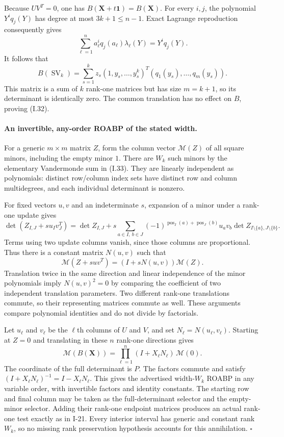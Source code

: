 Because $UV^T=0$, one has $B(\mathbf X+t\mathbf1)=B(\mathbf X)$.
For every $i,j$, the polynomial $Y^i q_j(Y)$ has degree at most
$3k+1\le n-1$.  Exact Lagrange reproduction consequently gives
\[
 \sum_{\ell=1}^n a_\ell^i q_j(a_\ell)\lambda_\ell(Y)
    =Y^i q_j(Y).
\]
It follows that
\[
 B(\operatorname{SV}_k)
   =\sum_{s=1}^k z_s
       (1,y_s,\ldots,y_s^k)^T
       (q_1(y_s),\ldots,q_m(y_s)).
\]
This matrix is a sum of $k$ rank-one matrices but has size
$m=k+1$, so its determinant is identically zero.  The common
translation has no effect on $B$, proving (I.32).

\paragraph{An invertible, any-order ROABP of the stated width.}
For a generic $m\times m$ matrix $Z$, form the column vector
$\mathcal M(Z)$ of all square minors, including the empty
minor $1$.  There are $W_k$ such minors by the elementary
Vandermonde sum in (I.33).  They are linearly independent as
polynomials: distinct row/column index sets have distinct
row and column multidegrees, and each individual determinant
is nonzero.

For fixed vectors $u,v$ and an indeterminate $s$, expansion
of a minor under a rank-one update gives
\[
 \det(Z_{I,J}+s u_Iv_J^T)
 =\det Z_{I,J}
  +s\sum_{a\in I,\ b\in J}
        (-1)^{\operatorname{pos}_I(a)+\operatorname{pos}_J(b)}
        u_av_b\det Z_{I\setminus\{a\},J\setminus\{b\}}.
\]
Terms using two update columns vanish, since those columns are
proportional.  Thus there is a constant matrix $N(u,v)$ such that
\[
 \mathcal M(Z+suv^T)=(I+sN(u,v))\mathcal M(Z).
\]
Translation twice in the same direction and linear independence
of the minor polynomials imply $N(u,v)^2=0$ by comparing the
coefficient of two independent translation parameters.  Two
different rank-one translations commute, so their representing
matrices commute as well.  These arguments compare polynomial
identities and do not divide by factorials.

Let $u_\ell$ and $v_\ell$ be the $\ell$th columns of $U$ and
$V$, and set $N_\ell=N(u_\ell,v_\ell)$.  Starting at $Z=0$
and translating in these $n$ rank-one directions gives
\[
 \mathcal M(B(\mathbf X))
     =\prod_{\ell=1}^n(I+X_\ell N_\ell)\,\mathcal M(0).
\]
The coordinate of the full determinant is $P$.  The factors
commute and satisfy
$(I+X_\ell N_\ell)^{-1}=I-X_\ell N_\ell$.
This gives the advertised width-$W_k$ ROABP in any variable
order, with invertible factors and identity constants.
The starting row and final column may be taken as the
full-determinant selector and the empty-minor selector.
Adding their rank-one endpoint matrices produces an actual
rank-one test exactly as in I-21.  Every interior interval
has generic and constant rank $W_k$, so no missing rank
preservation hypothesis accounts for this annihilation.
\hfill$\square$

